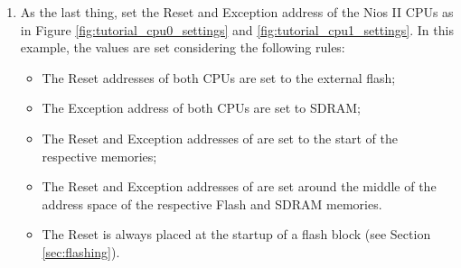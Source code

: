 \begin{enumerate}
\item As the last thing, set the Reset and Exception address of the
  Nios II CPUs as in Figure \ref{fig:tutorial_cpu0_settings} and
  \ref{fig:tutorial_cpu1_settings}. In this example, the values are
  set considering the following rules:
  \begin{itemize}
    \item The Reset addresses of both CPUs are set to the external
      flash;
    \item The Exception address of both CPUs are set to SDRAM;
    \item The Reset and Exception addresses of  are set
      to the start of the respective memories;
    \item The Reset and Exception addresses of  are set
      around the middle of the address space of the respective Flash
      and SDRAM memories.
    \item The Reset is always placed at the startup of a flash block
      (see Section \ref{sec:flashing}).
  \end{itemize}
%
\begin{figure}


\end{figure}
\end{enumerate}
